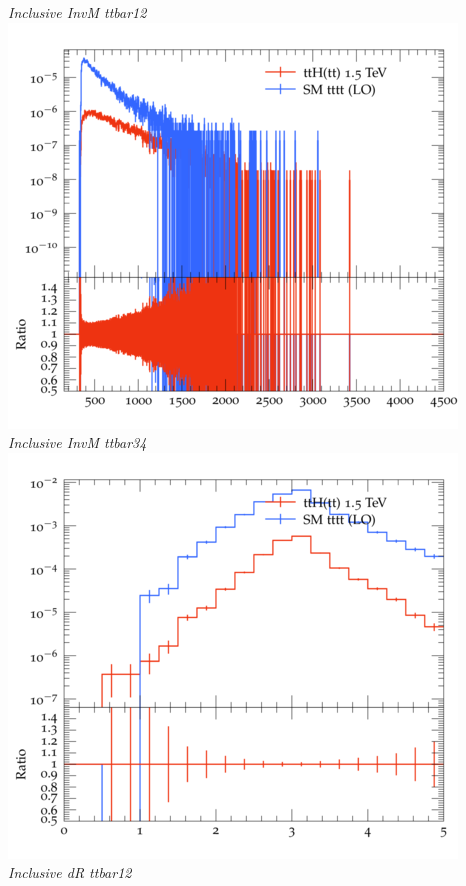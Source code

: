 \documentclass{beamer}
\begin{document}
\begin{frame}
\begin{columns}
\textit{\small Inclusive InvM ttbar12}
\includegraphics[width=\textwidth]{../plots/ttH_1500/tttt_ttH/Inclusive_InvM_ttbar34.png}\\
\textit{\small Inclusive InvM ttbar34}
\includegraphics[width=\textwidth]{../plots/ttH_1500/tttt_ttH/Inclusive_dR_ttbar12.png}\\
\textit{\small Inclusive dR ttbar12}
\end{columns}
\end{frame}
\end{document}
